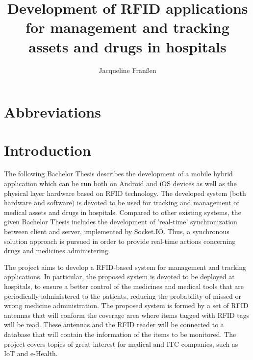 \documentclass[12pt,a4paper]{book}
\author{Jacqueline Franßen}
\title{Development of RFID applications for management and tracking assets and drugs in hospitals}
\begin{document}
\pagestyle{bloque_inicial} %

\cleardoublepage
\cleardoublepage
\tableofcontents
\cleardoublepage
{}
\listoffigures
\chapter*{Abbreviations}

\cleardoublepage
{}
\chapter*{\textbf{Introduction}}
The following Bachelor Thesis describes the development of a mobile hybrid application which can be run both on Android and iOS devices as well as the physical layer hardware based on RFID technology. The developed system (both hardware and software) is devoted to be used for tracking and management of medical assets and drugs in hospitals. Compared to other existing systems, the given Bachelor Thesis includes the development of 'real-time' synchronization between client and server, implemented by Socket.IO. Thus, a synchronous solution approach is pursued in order to provide real-time actions concerning drugs and medicines administering.

The project aims to develop a RFID-based system for management and tracking applications. In particular, the proposed system is devoted to be deployed at hospitals, to ensure a better control of the medicines and medical tools that are periodically administered to the patients, reducing the probability of missed or wrong medicine administration. The proposed system is formed by a set of RFID antennas that will conform the coverage area where items tagged with RFID tags will be read. These antennas and the RFID reader will be connected to a database that will contain the information of the items to be monitored. The project covers topics of great interest for medical and \ac{ITC} companies, such as IoT and e-Health.
\cleardoublepage
\end{document}
